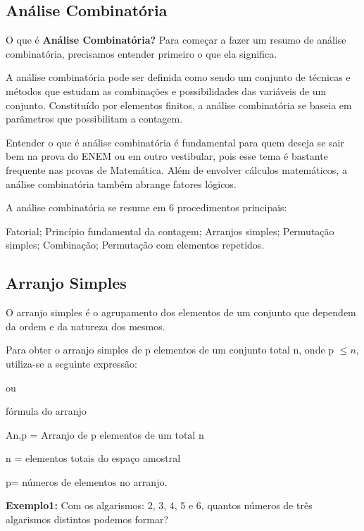 \begin{multicols*}{2}

	\subsection{Análise Combinatória}


	O que é \textbf{Análise Combinatória?}
	Para começar a fazer um resumo de análise combinatória, precisamos entender primeiro o que ela significa.

	A análise combinatória pode ser definida como sendo um conjunto de técnicas e métodos que estudam as combinações e possibilidades das variáveis de um conjunto. Constituído por elementos finitos, a análise combinatória se baseia em parâmetros que possibilitam a contagem.

	Entender o que é análise combinatória é fundamental para quem deseja se sair bem na prova do ENEM ou em outro vestibular, pois esse tema é bastante frequente nas provas de Matemática. Além de envolver cálculos matemáticos, a análise combinatória também abrange fatores lógicos.

	A análise combinatória se resume em 6 procedimentos principais:

	Fatorial;
	Princípio fundamental da contagem;
	Arranjos simples;
	Permutação simples;
	Combinação;
	Permutação com elementos repetidos.

	\subsection{Arranjo Simples}

	O arranjo simples é o agrupamento dos elementos de um conjunto que dependem da ordem e da natureza dos mesmos.

	Para obter o arranjo simples de p elementos de um conjunto total  n, onde p $\leq n$, utiliza-se a seguinte expressão:

	 ou 

	fórmula do arranjo

	An,p = Arranjo de p elementos de um total n

	n = elementos totais do espaço amostral

	p= números de elementos no arranjo.

	\textbf{Exemplo1:} Com os algarismos: 2, 3, 4, 5 e 6, quantos números de três algarismos distintos podemos formar?


\end{multicols*}
